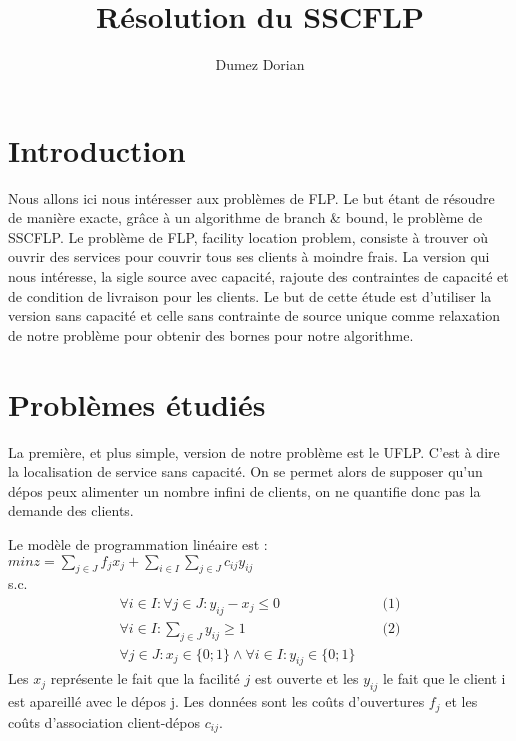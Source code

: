 \documentclass[12pt,a4paper]{article}
\begin{document}
\title{Résolution du SSCFLP}

\author{Dumez Dorian}

\maketitle

\section*{Introduction}

Nous allons ici nous intéresser aux problèmes de FLP. Le but étant de résoudre de manière exacte, grâce à un algorithme de branch \& bound, le problème de SSCFLP. Le problème de FLP, facility location problem, consiste à trouver où ouvrir des services pour couvrir tous ses clients à moindre frais. La version qui nous intéresse, la sigle source avec capacité, rajoute des contraintes de capacité et de condition de livraison pour les clients. Le but de cette étude est d'utiliser la version sans capacité et celle sans contrainte de source unique comme relaxation de notre problème pour obtenir des bornes pour notre algorithme. 

\section{Problèmes étudiés}

La première, et plus simple, version de notre problème est le UFLP. C'est à dire la localisation de service sans capacité. On se permet alors de supposer qu'un dépos peux alimenter un nombre infini de clients, on ne quantifie donc pas la demande des clients.

Le modèle de programmation linéaire est :\\
$min z = \sum \limits_{j \in J} f_j x_j + \sum \limits_{i \in I} \sum \limits_{j \in J} c_{ij} y_{ij}$\\
s.c.
\begin{align*}
 \forall i \in I : \forall j \in J : y_{ij} - x_j \leqslant 0 & & \text{ (1)} \\
 \forall i \in I : \sum \limits_{j \in J} y_{ij} \geqslant 1 & & \text{ (2)} \\
 \forall j \in J : x_j \in \{0;1\} \land \forall i \in I  : y_{ij} \in \{0;1\} 
\end{align*}
Les $x_j$ représente le fait que la facilité $j$ est ouverte et les $y_{ij}$ le fait que le client i est apareillé avec le dépos j. Les données sont les coûts d'ouvertures $f_j$ et les coûts d'association client-dépos $c_{ij}$.
\end{document}
